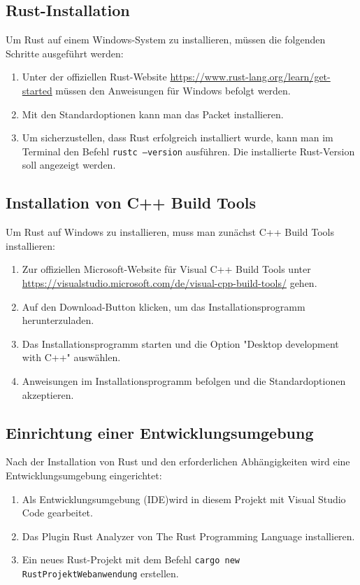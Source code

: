 
    \subsection{Rust-Installation}
    Um Rust auf einem Windows-System zu installieren, müssen die folgenden Schritte ausgeführt werden:
    \begin{enumerate}
        \item Unter der offiziellen Rust-Website \url{https://www.rust-lang.org/learn/get-started} müssen den Anweisungen für Windows befolgt werden.
        \item Mit den Standardoptionen kann man das Packet installieren.
        \item Um sicherzustellen, dass Rust erfolgreich installiert wurde, kann man im Terminal den Befehl \texttt{rustc --version} ausführen. Die installierte Rust-Version soll angezeigt werden.
    \end{enumerate}

    \subsection{Installation von C++ Build Tools}
    Um Rust auf Windows zu installieren, muss man zunächst C++ Build Tools installieren:
    \begin{enumerate}
        \item Zur offiziellen Microsoft-Website für Visual C++ Build Tools unter \url{https://visualstudio.microsoft.com/de/visual-cpp-build-tools/} gehen.
        \item Auf den Download-Button klicken, um das Installationsprogramm herunterzuladen.
        \item Das Installationsprogramm starten und die Option "Desktop development with C++" auswählen.
        \item Anweisungen im Installationsprogramm befolgen und die Standardoptionen akzeptieren.
    \end{enumerate}
    
    \subsection{Einrichtung einer Entwicklungsumgebung}
    Nach der Installation von Rust und den erforderlichen Abhängigkeiten wird eine Entwicklungsumgebung eingerichtet:
    \begin{enumerate}
        \item Als Entwicklungsumgebung (IDE)wird in diesem Projekt mit Visual Studio Code gearbeitet.
        \item Das Plugin Rust Analyzer von The Rust Programming Language installieren.
        \item Ein neues Rust-Projekt mit dem Befehl \texttt{cargo new RustProjektWebanwendung} erstellen.
    \end{enumerate}
